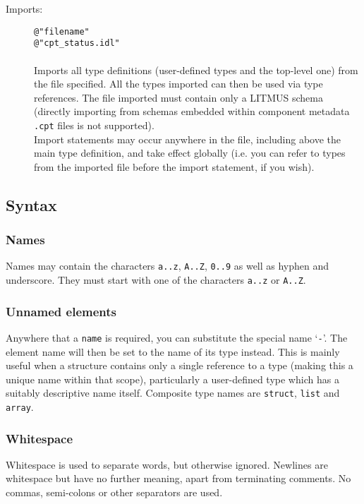 \documentclass[12pt,a4paper,twoside]{article}
\renewcommand{\_}{\texttt{\symbol{95}}}
\begin{document}
\begin{description}
\item[Imports:]
	\verb^@"filename"^\\
	\verb^@"cpt_status.idl"^\\
	\\
	Imports all type definitions (user-defined types and the top-level one)
	from the file specified. All the types imported can then be used via
	type references. The file imported must contain only a LITMUS schema
	(directly importing from schemas embedded within component metadata
	\verb^.cpt^ files is not supported).\\
	Import statements may occur anywhere in the file, including above
	the main type definition, and take effect globally (i.e. you can
	refer to types from the imported file before the import statement,
	if you wish).
\end{description}

\subsection{Syntax}

\subsubsection*{Names}

Names may contain the characters \verb^a..z^, \verb^A..Z^,
\verb^0..9^ as well as hyphen and underscore. They must start
with one of the characters \verb^a..z^ or \verb^A..Z^.

\subsubsection*{Unnamed elements}

Anywhere that a \verb^name^ is required, you can substitute the special
name `\verb^-^'. The element name will then be set to
the name of its type instead. This is mainly useful when a structure
contains only a single reference to a type (making this a unique name
within that scope), particularly a
user-defined type which has a suitably descriptive name itself.
Composite type names are \verb^struct^, \verb^list^ and \verb^array^.

\subsubsection*{Whitespace}

Whitespace is used to separate words, but otherwise ignored.
Newlines are whitespace but have no further meaning, apart from
terminating comments.
No commas, semi-colons or other separators are used.
\end{document}
